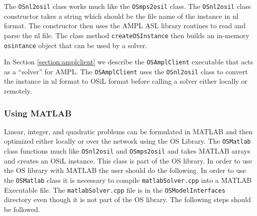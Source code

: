 \documentclass[11pt]{article}
\renewcommand{\_}{{\char"5F}}
\renewcommand{\{}{{\char"7B}}
\renewcommand{\}}{{\char"7D}}
\renewcommand{\^}{{\char"0D}}
\renewcommand{\'}{{\char"0D}}
\begin{document}
The {\tt OSnl2osil} class works much like the {\tt OSmps2osil} class. The {\tt OSnl2osil} class constructor takes a string which should be the file name of the instance in nl format. The constructor then uses the AMPL ASL library routines to read and parse the nl file. The class method {\tt createOSInstance} then builds  an in-memory {\tt osintance} object  that can be used by a solver.

In Section  \ref{section:amplclient}  we describe the {\tt OSAmplClient} executable that acts as a ``solver'' for AMPL. The {\tt OSAmplClient} uses the {\tt OSnl2osil} class to convert the instance in nl format to OSiL format before calling a solver either locally or remotely.

\subsubsection{Using MATLAB}\label{section:usingmatlab}

Linear, integer, and quadratic problems can be formulated in MATLAB and then optimized either locally or over the network using the OS Library. The {\tt OSMatlab} class functions much like {\tt OSnl2osil} and {\tt OSmps2osil} and takes MATLAB arrays and creates an OSiL instance.  This class is part of the OS library. In order to use the OS library with MATLAB the user should do the following.  In order to use the {\tt OSMatlab} class it is necessary to  compile {\tt matlabSolver.cpp}  into  a MATLAB Executable file.  The {\tt matlabSolver.cpp} file is in the {\tt OSModelInterfaces} directory even though it is not part of the OS library. The following steps should be followed.
\end{document}
